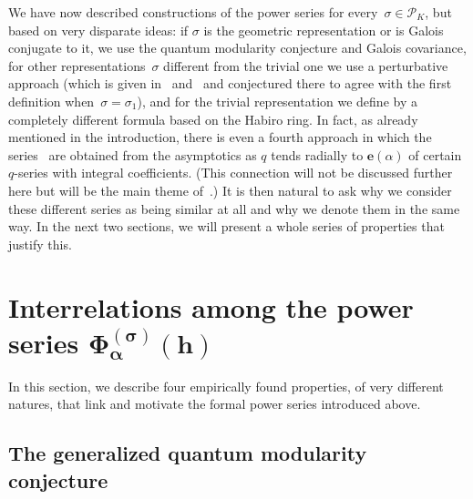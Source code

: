 \documentclass[pdftex]{sigma}
\numberwithin{equation}{section}
\def\calP{\mathcal P}
\def\calP{\mathcal P}
\def\e{\mathbf{e}}
\def\a{\alpha}
\def\e{\mathbf{e}}
\def\a{\alpha}
\def\s{\sigma}
\begin{document}
We have now described constructions of the power series \smash{$\Phi_\a^{(K,\s)}(h)$}
for every~$\s\in\calP_K$, but based on very disparate ideas: if $\s$ is the
geometric representation or is Galois conjugate to it, we use the quantum modularity conjecture and Galois covariance, for other representations~$\s$
different from the trivial one we use a perturbative approach (which is
given in~\cite{DG} and~\cite{DG2} and conjectured there to agree with the
first definition when~$\s=\s_1$), and for the trivial representation we
define \smash{$\Phi_\a^{(K,\s)}(h)$} by a completely different formula based on the
Habiro ring. In fact, as already mentioned in the introduction, there
is even a fourth approach in which the series~\smash{$\Phi_\a^{(K,\s)}$} are obtained
from the asymptotics as $q$ tends radially to $\e(\a)$ of certain $q$-series
with integral coefficients. (This connection will not be discussed
further here but will be the main theme of~\cite{GZ:qseries}.) It is then
natural to ask why we consider these different series as being similar at
all and why we denote them in the same way. In the next two sections, we will
present a whole series of properties that justify this.

\section[Interrelations among the power series
 Phi\_a\^{}\{(s)\}(h)]{Interrelations among the power series
 $\boldsymbol{\Phi_\a^{(\s)}(h)}$}
\label{sec.inter}

In this section, we describe four empirically found properties, of very different
natures, that link and motivate the formal power series introduced above.

\subsection{The generalized quantum modularity conjecture}\label{sub.GQMC}
\end{document}
